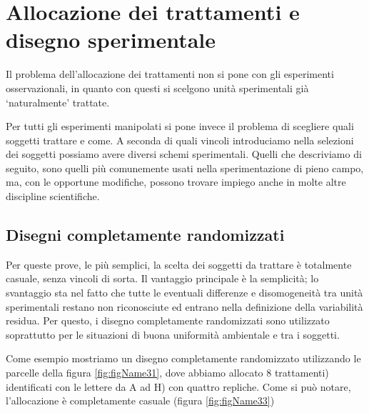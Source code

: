 \documentclass[a4paper,12pt,oneside]{book}
\begin{document}
\hypertarget{allocazione-dei-trattamenti-e-disegno-sperimentale}{%
\section{Allocazione dei trattamenti e disegno sperimentale}\label{allocazione-dei-trattamenti-e-disegno-sperimentale}}

Il problema dell'allocazione dei trattamenti non si pone con gli esperimenti osservazionali, in quanto con questi si scelgono unità sperimentali già `naturalmente' trattate.

Per tutti gli esperimenti manipolati si pone invece il problema di scegliere quali soggetti trattare e come. A seconda di quali vincoli introduciamo nella selezioni dei soggetti possiamo avere diversi schemi sperimentali. Quelli che descriviamo di seguito, sono quelli più comunemente usati nella sperimentazione di pieno campo, ma, con le opportune modifiche, possono trovare impiego anche in molte altre discipline scientifiche.

\hypertarget{disegni-completamente-randomizzati}{%
\subsection{Disegni completamente randomizzati}\label{disegni-completamente-randomizzati}}

Per queste prove, le più semplici, la scelta dei soggetti da trattare è totalmente casuale, senza vincoli di sorta. Il vantaggio principale è la semplicità; lo svantaggio sta nel fatto che tutte le eventuali differenze e disomogeneità tra unità sperimentali restano non riconosciute ed entrano nella definizione della variabilità residua. Per questo, i disegno completamente randomizzati sono utilizzato soprattutto per le situazioni di buona uniformità ambientale e tra i soggetti.

Come esempio mostriamo un disegno completamente randomizzato utilizzando le parcelle della figura \ref{fig:figName31}, dove abbiamo allocato 8 trattamenti) identificati con le lettere da A ad H) con quattro repliche. Come si può notare, l'allocazione è completamente casuale (figura \ref{fig:figName33})
\end{document}
